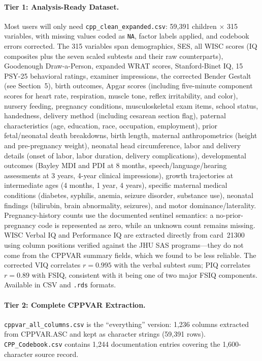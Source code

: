 \documentclass[12pt]{article}
\begin{document}
\paragraph{Tier 1: Analysis-Ready Dataset.}
Most users will only need \texttt{cpp\_clean\_expanded.csv}: 59,391 children $\times$ 315 variables, with missing values coded as \texttt{NA}, factor labels applied, and codebook errors corrected. The 315 variables span demographics, SES, all WISC scores (IQ composites plus the seven scaled subtests and their raw counterparts), Goodenough Draw-a-Person, expanded WRAT scores, Stanford-Binet IQ, 15 PSY-25 behavioral ratings, examiner impressions, the corrected Bender Gestalt (see Section~5), birth outcomes, Apgar scores (including five-minute component scores for heart rate, respiration, muscle tone, reflex irritability, and color), nursery feeding, pregnancy conditions, musculoskeletal exam items, school status, handedness, delivery method (including cesarean section flag), paternal characteristics (age, education, race, occupation, employment), prior fetal/neonatal death breakdowns, birth length, maternal anthropometrics (height and pre-pregnancy weight), neonatal head circumference, labor and delivery details (onset of labor, labor duration, delivery complications), developmental outcomes (Bayley MDI and PDI at 8 months, speech/language/hearing assessments at 3 years, 4-year clinical impressions), growth trajectories at intermediate ages (4 months, 1 year, 4 years), specific maternal medical conditions (diabetes, syphilis, anemia, seizure disorder, substance use), neonatal findings (bilirubin, brain abnormality, seizures), and motor dominance/laterality. Pregnancy-history counts use the documented sentinel semantics: a no-prior-pregnancy code is represented as zero, while an unknown count remains missing. WISC Verbal IQ and Performance IQ are extracted directly from card~21300 using column positions verified against the JHU SAS programs---they do not come from the CPPVAR summary fields, which we found to be less reliable. The corrected VIQ correlates $r = 0.995$ with the verbal subtest sum; PIQ correlates $r = 0.89$ with FSIQ, consistent with it being one of two major FSIQ components. Available in CSV and \texttt{.rds} formats.

\paragraph{Tier 2: Complete CPPVAR Extraction.}
\texttt{cppvar\_all\_columns.csv} is the ``everything'' version: 1,236 columns extracted from CPPVAR.ASC and kept as character strings (59,391 rows). \texttt{CPP\_Codebook.csv} contains 1,244 documentation entries covering the 1,600-character source record.
\end{document}
